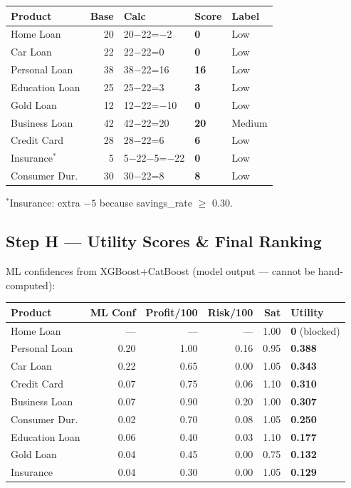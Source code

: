 \documentclass[12pt,a4paper]{article}
\begin{document}
\begin{tabular}{lrlll}
\toprule
\textbf{Product} & \textbf{Base} & \textbf{Calc} & \textbf{Score} & \textbf{Label} \\
\midrule
Home Loan      & 20 & 20$-$22=$-$2 & \textbf{0}  & Low \\
Car Loan       & 22 & 22$-$22=0  & \textbf{0}  & Low \\
Personal Loan  & 38 & 38$-$22=16 & \textbf{16} & Low \\
Education Loan & 25 & 25$-$22=3  & \textbf{3}  & Low \\
Gold Loan      & 12 & 12$-$22=$-$10 & \textbf{0} & Low \\
Business Loan  & 42 & 42$-$22=20 & \textbf{20} & Medium \\
Credit Card    & 28 & 28$-$22=6  & \textbf{6}  & Low \\
Insurance$^*$  & 5  & 5$-$22$-$5=$-$22 & \textbf{0} & Low \\
Consumer Dur.  & 30 & 30$-$22=8  & \textbf{8}  & Low \\
\bottomrule
\end{tabular}

$^*$Insurance: extra $-5$ because savings\_rate $\geq$ 0.30.

\subsection{Step H — Utility Scores \& Final Ranking}

ML confidences from XGBoost+CatBoost (model output — cannot be hand-computed):

\begin{tabular}{lrrrrl}
\toprule
\textbf{Product} & \textbf{ML Conf} & \textbf{Profit/100} & \textbf{Risk/100} & \textbf{Sat} & \textbf{Utility} \\
\midrule
Home Loan      & — & — & — & 1.00 & \textbf{0} (blocked) \\
Personal Loan  & 0.20 & 1.00 & 0.16 & 0.95 & \textbf{0.388} \\
Car Loan       & 0.22 & 0.65 & 0.00 & 1.05 & \textbf{0.343} \\
Credit Card    & 0.07 & 0.75 & 0.06 & 1.10 & \textbf{0.310} \\
Business Loan  & 0.07 & 0.90 & 0.20 & 1.00 & \textbf{0.307} \\
Consumer Dur.  & 0.02 & 0.70 & 0.08 & 1.05 & \textbf{0.250} \\
Education Loan & 0.06 & 0.40 & 0.03 & 1.10 & \textbf{0.177} \\
Gold Loan      & 0.04 & 0.45 & 0.00 & 0.75 & \textbf{0.132} \\
Insurance      & 0.04 & 0.30 & 0.00 & 1.05 & \textbf{0.129} \\
\bottomrule
\end{tabular}
\end{document}
